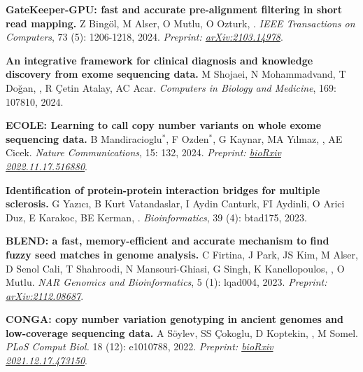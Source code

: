 \vspace{-.2cm}
    {\bf GateKeeper-GPU: fast and accurate pre-alignment filtering in short read mapping.}
    Z Bingöl, M Alser, O Mutlu, O Ozturk, \calkan{}.
    {\it IEEE Transactions on Computers}, 73 (5): 1206-1218, 2024.
    \textit{Preprint: \href{https://doi.org/10.48550/arXiv.2103.14978}{arXiv:2103.14978}}.

\vspace{-.2cm}
    {\bf An integrative framework for clinical diagnosis and knowledge discovery from exome sequencing data.} M Shojaei, N Mohammadvand, T Doğan, \calkan{}, R Çetin Atalay, AC Acar.
    {\it Computers in Biology and Medicine}, 169: 107810, 2024.

\vspace{-.2cm}
    {\bf ECOLE: Learning to call copy number variants on whole exome sequencing data.} B Mandiracioglu$^\ast$, F Ozden$^\ast$, G Kaynar, MA Yılmaz, \calkan{}, AE Cicek. {\it Nature Communications}, 15: 132, 2024. \textit{Preprint: \href{https://doi.org/10.1101/2022.11.17.516880}{bioRxiv 2022.11.17.516880}}.

\vspace{-.2cm}
    {\bf Identification of protein-protein interaction bridges for multiple sclerosis.} G Yazıcı, B Kurt Vatandaslar, I Aydin Canturk, FI Aydinli, O Arici Duz, E Karakoc, BE Kerman, \calkan{}. {\it Bioinformatics}, 39 (4): btad175, 2023.

\vspace{-.2cm}
    {\bf BLEND: a fast, memory-efficient and accurate mechanism to find fuzzy seed matches in genome analysis.} C Firtina, J Park, JS Kim, M Alser, D Senol Cali, T Shahroodi, N Mansouri-Ghiasi, G Singh, K Kanellopoulos, \calkan{}, O Mutlu. {\it NAR Genomics and Bioinformatics}, 5 (1): lqad004, 2023. \textit{Preprint: \href{https://doi.org/10.48550/arXiv.2112.08687}{arXiv:2112.08687}}.

\vspace{-.2cm}
    {\bf CONGA: copy number variation genotyping in ancient genomes and low-coverage sequencing data.}  A Söylev, SS Çokoglu, D Koptekin, \calkan{}, M Somel. {\it PLoS Comput Biol.} 18 (12): e1010788, 2022.     \textit{Preprint: \href{https://doi.org/10.1101/2021.12.17.473150}{bioRxiv 2021.12.17.473150}}.
    

